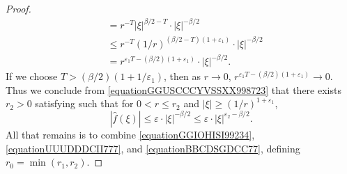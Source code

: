 \documentclass[dvipsnames,letterpaper,12pt]{article}
\numberwithin{equation}{section}
\numberwithin{theorem}{section}
\begin{document}
\begin{proof}
\begin{equation}
\begin{split}
        &= r^{-T} |\xi|^{\beta/2 - T} \cdot |\xi|^{-\beta/2}\\
        &\leq r^{-T} (1/r)^{(\beta/2 - T)(1 + \varepsilon_1)} \cdot |\xi|^{-\beta/2}\\
        &= r^{\varepsilon_1 T - (\beta/2)(1 + \varepsilon_1)} \cdot |\xi|^{-\beta/2}.
    \end{split}
    \end{equation}
    If we choose $T > (\beta/2)(1 + 1/\varepsilon_1)$, then as $r \to 0$, $r^{\varepsilon_1 T - (\beta/2)(1 + \varepsilon_1)} \to 0$. Thus we conclude from \eqref{equationGGUSCCCYVSSXX998723} that there exists $r_2 > 0$ satisfying such that for $0 < r \leq r_2$ and $|\xi| \geq (1/r)^{1+\varepsilon_1}$,
    \begin{equation} \label{equationBBCDSGDCC77}
        |\widehat{f}(\xi)| \leq \varepsilon \cdot |\xi|^{-\beta/2} \leq \varepsilon \cdot |\xi|^{\varepsilon_2-\beta/2}.
    \end{equation}
    All that remains is to combine \eqref{equationGGIOHISI99234}, \eqref{equationUUUDDDCII777}, and \eqref{equationBBCDSGDCC77}, defining $r_0 = \min(r_1,r_2)$.
\end{proof}
\end{document}
